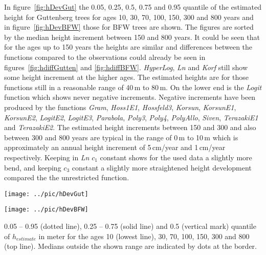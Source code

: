 \documentclass[a4paper,twocolumn]{article}
\begin{document}
In figure~\ref{fig:hDevGut} the 0.05, 0.25, 0.5, 0.75 and 0.95 quantile of
the estimated height for Guttenberg trees for ages 10, 30, 70,
100, 150, 300 and 800 years and in figure~\ref{fig:hDevBFW} those for
BFW trees are shown. The figures are sorted by the median height
increment between 150 and 800 years. It could be seen that for the
ages up to 150 years the heights are similar and differences between
the functions compared to the observations could already be seen in
figures~\ref{fig:hdiffGutten} and \ref{fig:hdiffBFW}. \emph{HyperLog},
\emph{Ln} and \emph{Korf} still show some height increment at the
higher ages. The estimated heights are for those functions still in a
reasonable range of 40\,m to 80\,m. On the lower end is the
\emph{Logit} function which shows never negative increments. Negative
increments have been produced by the functions \emph{Gram},
\emph{Hoss1E1}, \emph{Hossfeld3}, \emph{Korsun}, \emph{KorsunE1},
\emph{KorsunE2}, \emph{LogitE2}, \emph{LogitE3}, \emph{Parabola},
\emph{Poly3}, \emph{Poly4}, \emph{PolyAllo}, \emph{Siven},
\emph{TerazakiE1} and \emph{TerazakiE2}. The estimated height
increments between 150 and 300 and also between 300 and 800 years are
typical in the range of 0\,m to 10\,m which is approximately an annual
height increment of 5\,cm/year and 1\,cm/year respectively. Keeping in
\emph{Ln} $c_1$ constant shows for the used data a slightly more
bend, and keeping $c_3$ constant a slightly more straightened height
development compared the the unrestricted function.

\begin{figure*}[htbp]
  \begin{minipage}{.49\linewidth}
    \centering
    \texttt{[image: ../pic/hDevGut]}
    \caption{Height for ages 10, 30, 70, 100, 150, 300 and
      800 with Guttenberg data.}
    \label{fig:hDevGut}
  \end{minipage}
  \begin{minipage}{.49\linewidth}
    \centering
    \texttt{[image: ../pic/hDevBFW]}
    \caption{Height for ages 10, 30, 70, 100, 150, 300 and
      800 with BFW data.}
    \label{fig:hDevBFW}
  \end{minipage}
  \scriptsize{0.05 -- 0.95 (dotted line), 0.25 -- 0.75 (solid line)
    and 0.5 (vertical mark) quantile of $h_{estimate}$ in meter
    for the ages 10 (lowest line), 30, 70, 100, 150, 300 and 800 (top
    line). Medians outside the shown range are indicated by dots at
    the border.}
\end{figure*}
\end{document}
